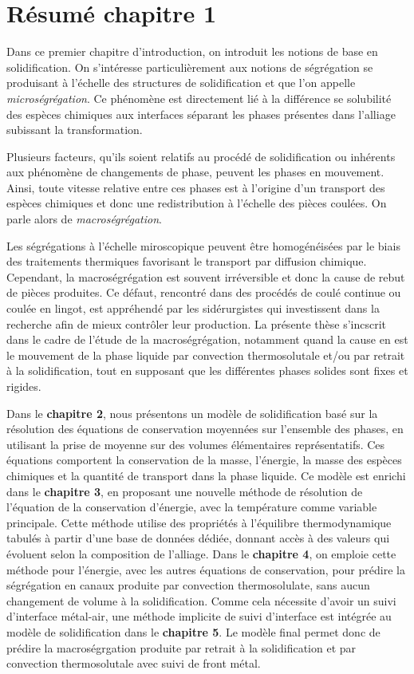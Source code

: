 \clearpage
\section*{Résumé chapitre 1}

Dans ce premier chapitre d'introduction, on introduit les notions de base en solidification. 
On s'intéresse particulièrement aux notions de ségrégation se produisant à l'échelle des structures 
de solidification et que l'on appelle \emph{microségrégation}. Ce phénomène est directement lié à la 
différence se solubilité des espèces chimiques aux interfaces séparant les phases présentes dans 
l'alliage subissant la transformation.


Plusieurs facteurs, qu'ils soient relatifs au procédé de solidification ou inhérents aux phénomène de changements de phase,
peuvent les phases en mouvement. Ainsi, toute vitesse relative entre ces phases est à l'origine d'un transport des espèces chimiques
et donc une redistribution à l'échelle des pièces coulées. On parle alors de \emph{macroségrégation}.


Les ségrégations à l'échelle miroscopique peuvent être homogénéisées par le biais 
des traitements thermiques favorisant le transport par diffusion chimique.
Cependant, la macroségrégation est souvent irréversible et donc la cause de rebut de pièces produites. 
Ce défaut, rencontré dans des procédés de coulé continue ou coulée en lingot, est appréhendé par les
sidérurgistes qui investissent dans la recherche afin de mieux contrôler leur production.
La présente thèse s'incscrit dans le cadre de l'étude de la macroségrégation, notamment quand la cause en est
le mouvement de la phase liquide par convection thermosolutale et/ou par retrait à la solidification, tout en supposant
que les différentes phases solides sont fixes et rigides.


Dans le \textbf{chapitre 2}, nous présentons un modèle de solidification
basé sur la résolution des équations de conservation moyennées sur l'ensemble des phases, en utilisant la prise de moyenne
sur des volumes élémentaires représentatifs. Ces équations comportent la conservation de la masse, l'énergie, la masse des espèces
chimiques et la quantité de transport dans la phase liquide. Ce modèle est enrichi dans le \textbf{chapitre 3}, 
en proposant une nouvelle méthode de résolution de l'équation de la conservation d'énergie, avec la température comme variable
principale. Cette méthode utilise des propriétés à l'équilibre thermodynamique tabulés à partir d'une base de données dédiée, donnant accès à
des valeurs qui évoluent selon la composition de l'alliage. Dans le \textbf{chapitre 4}, on emploie cette méthode pour l'énergie,
avec les autres équations de conservation, pour prédire la ségrégation en canaux produite par convection thermosolulate, sans aucun 
changement de volume à la solidification. Comme cela nécessite d'avoir un suivi d'interface métal-air, une méthode implicite de suivi d'interface
est intégrée au modèle de solidification dans le \textbf{chapitre 5}. Le modèle final permet donc de prédire la macroségrgation produite
par retrait à la solidification et par convection thermosolutale avec suivi de front métal.  